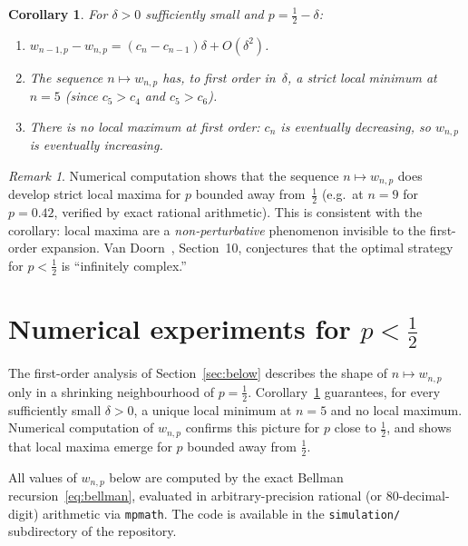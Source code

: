 \documentclass[12pt]{article}
\newtheorem{corollary}[theorem]{Corollary}
\theoremstyle{definition}
\theoremstyle{remark}
\newtheorem{remark}[theorem]{Remark}
\begin{document}
\begin{corollary}\label{cor:shape}
  For $\delta>0$ sufficiently small and $p=\tfrac12-\delta$:
  \begin{enumerate}[\rm(i)]
  \item $w_{n-1,p}-w_{n,p}=(c_n-c_{n-1})\delta+O(\delta^2)$.
  \item The sequence $n\mapsto w_{n,p}$ has, to first order
    in~$\delta$, a strict local minimum at $n=5$ (since $c_5>c_4$
    and $c_5>c_6$).
  \item There is no local maximum at first order: $c_n$ is eventually
    decreasing, so $w_{n,p}$ is eventually increasing.
  \end{enumerate}
\end{corollary}

\begin{remark}
  Numerical computation shows that the sequence $n\mapsto w_{n,p}$
  does develop strict local maxima for $p$ bounded away
  from~$\tfrac12$ (e.g.\ at $n=9$ for $p=0.42$, verified by exact
  rational arithmetic).  This is consistent with the corollary: local
  maxima are a \emph{non-perturbative} phenomenon invisible to the
  first-order expansion.  Van Doorn~\cite{vanDoorn2024}, Section~10,
  conjectures that the optimal strategy for $p<\tfrac12$ is
  ``infinitely complex.''
\end{remark}

\section{Numerical experiments for \texorpdfstring{$p<\tfrac12$}{p<1/2}}\label{sec:numerics}

The first-order analysis of Section~\ref{sec:below} describes
the shape of $n\mapsto w_{n,p}$ only in a shrinking neighbourhood
of $p=\tfrac12$.  Corollary~\ref{cor:shape} guarantees, for every
sufficiently small $\delta>0$, a unique local minimum at $n=5$ and
no local maximum.  Numerical computation of $w_{n,p}$ confirms
this picture for $p$ close to $\tfrac12$, and shows that local
maxima emerge for $p$ bounded away from $\tfrac12$.

All values of $w_{n,p}$ below are computed by the exact Bellman
recursion~\eqref{eq:bellman}, evaluated in arbitrary-precision
rational (or $80$-decimal-digit) arithmetic via
\texttt{mpmath}.  The code is available in the \texttt{simulation/}
subdirectory of the repository.
\end{document}
